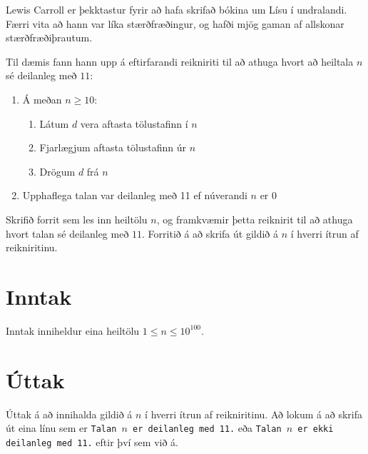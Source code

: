 

Lewis Carroll er þekktastur fyrir að hafa skrifað bókina um Lísu í undralandi.
Færri vita að hann var líka stærðfræðingur, og hafði mjög gaman af allskonar
stærðfræðiþrautum.

Til dæmis fann hann upp á eftirfarandi reikniriti til að athuga hvort að
heiltala $n$ sé deilanleg með $11$:

\begin{enumerate}
    \item Á meðan $n \geq 10$:
        \begin{enumerate}
            \item Látum $d$ vera aftasta tölustafinn í $n$
            \item Fjarlægjum aftasta tölustafinn úr $n$
            \item Drögum $d$ frá $n$
        \end{enumerate}
    \item Upphaflega talan var deilanleg með 11 ef núverandi $n$ er $0$
\end{enumerate}

Skrifið forrit sem les inn heiltölu $n$, og framkvæmir
þetta reiknirit til að athuga hvort talan sé deilanleg með $11$. Forritið á að
skrifa út gildið á $n$ í hverri ítrun af reikniritinu.

\section*{Inntak}
Inntak inniheldur eina heiltölu $1 \leq n\leq 10^{100}$.

\section*{Úttak}
Úttak á að innihalda gildið á $n$ í hverri ítrun af reikniritinu. Að lokum á að
skrifa út eina línu sem er \texttt{Talan $n$ er deilanleg med 11.} eða
\texttt{Talan $n$ er ekki deilanleg med 11.} eftir því sem við á.

